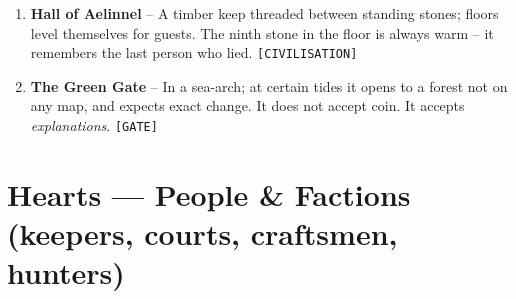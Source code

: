 \begin{enumerate}
\item[K] \textbf{Hall of Aelinnel} -- A timber keep threaded between standing stones; floors level themselves for guests. The ninth stone in the floor is always warm -- it remembers the last person who lied. \texttt{[CIVILISATION]}
\item[A] \textbf{The Green Gate} -- In a sea-arch; at certain tides it opens to a forest not on any map, and expects exact change. It does not accept coin. It accepts \emph{explanations}. \texttt{[GATE]}
\end{enumerate}

\section*{Hearts --- People \& Factions (keepers, courts, craftsmen, hunters)}
\label{sec:aelinnel-people}
